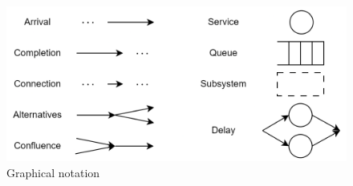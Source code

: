 \begin{figure}[H]
    \centering
    \includegraphics[width=0.75\linewidth]{images/gra.png}
    \caption{Graphical notation}
\end{figure}